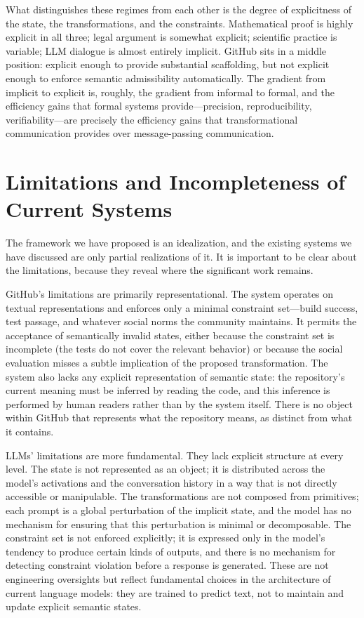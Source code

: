 \documentclass[12pt, letterpaper]{article}
\begin{document}
What distinguishes these regimes from each other is the degree of explicitness of the state, the transformations, and the constraints. Mathematical proof is highly explicit in all three; legal argument is somewhat explicit; scientific practice is variable; LLM dialogue is almost entirely implicit. GitHub sits in a middle position: explicit enough to provide substantial scaffolding, but not explicit enough to enforce semantic admissibility automatically. The gradient from implicit to explicit is, roughly, the gradient from informal to formal, and the efficiency gains that formal systems provide---precision, reproducibility, verifiability---are precisely the efficiency gains that transformational communication provides over message-passing communication.

\section{Limitations and Incompleteness of Current Systems}

The framework we have proposed is an idealization, and the existing systems we have discussed are only partial realizations of it. It is important to be clear about the limitations, because they reveal where the significant work remains.

GitHub's limitations are primarily representational. The system operates on textual representations and enforces only a minimal constraint set---build success, test passage, and whatever social norms the community maintains. It permits the acceptance of semantically invalid states, either because the constraint set is incomplete (the tests do not cover the relevant behavior) or because the social evaluation misses a subtle implication of the proposed transformation. The system also lacks any explicit representation of semantic state: the repository's current meaning must be inferred by reading the code, and this inference is performed by human readers rather than by the system itself. There is no object within GitHub that represents what the repository means, as distinct from what it contains.

LLMs' limitations are more fundamental. They lack explicit structure at every level. The state is not represented as an object; it is distributed across the model's activations and the conversation history in a way that is not directly accessible or manipulable. The transformations are not composed from primitives; each prompt is a global perturbation of the implicit state, and the model has no mechanism for ensuring that this perturbation is minimal or decomposable. The constraint set is not enforced explicitly; it is expressed only in the model's tendency to produce certain kinds of outputs, and there is no mechanism for detecting constraint violation before a response is generated. These are not engineering oversights but reflect fundamental choices in the architecture of current language models: they are trained to predict text, not to maintain and update explicit semantic states.
\end{document}
